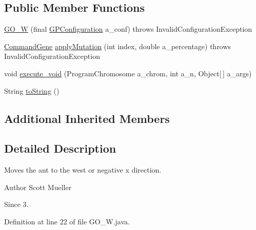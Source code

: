\subsection*{Public Member Functions}
\begin{DoxyCompactItemize}
\item 
\hyperlink{classexamples_1_1gp_1_1painted_desert_1_1_g_o___w_a452acdfca3f4e41994e5f1fd114ef4ce}{G\-O\-\_\-\-W} (final \hyperlink{classorg_1_1jgap_1_1gp_1_1impl_1_1_g_p_configuration}{G\-P\-Configuration} a\-\_\-conf)  throws Invalid\-Configuration\-Exception 
\item 
\hyperlink{classorg_1_1jgap_1_1gp_1_1_command_gene}{Command\-Gene} \hyperlink{classexamples_1_1gp_1_1painted_desert_1_1_g_o___w_afb6bde6b772198159171a2da450bed8a}{apply\-Mutation} (int index, double a\-\_\-percentage)  throws Invalid\-Configuration\-Exception 
\item 
void \hyperlink{classexamples_1_1gp_1_1painted_desert_1_1_g_o___w_ade3bd740b2c9b16627b4ff38f241d9f4}{execute\-\_\-void} (Program\-Chromosome a\-\_\-chrom, int a\-\_\-n, Object\mbox{[}$\,$\mbox{]} a\-\_\-args)
\item 
String \hyperlink{classexamples_1_1gp_1_1painted_desert_1_1_g_o___w_aac86c93a27d2ca24465f6fde081cfbb5}{to\-String} ()
\end{DoxyCompactItemize}
\subsection*{Additional Inherited Members}


\subsection{Detailed Description}
Moves the ant to the west or negative x direction.

\begin{DoxyAuthor}{Author}
Scott Mueller 
\end{DoxyAuthor}
\begin{DoxySince}{Since}
3. 
\end{DoxySince}


Definition at line 22 of file G\-O\-\_\-\-W.\-java.



